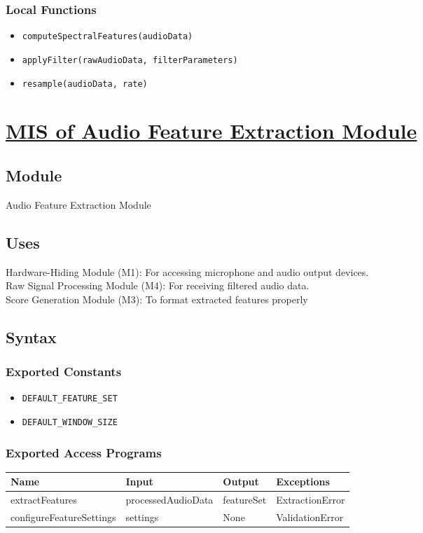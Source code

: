 \documentclass[12pt, titlepage]{article}
\begin{document}
\subsubsection{Local Functions}  
\begin{itemize}  
    \item \texttt{computeSpectralFeatures(audioData)}
    \item \texttt{applyFilter(rawAudioData, filterParameters)}  
    \item \texttt{resample(audioData, rate)}  
\end{itemize}  

\section{\hyperref[mAFE]{MIS of Audio Feature Extraction Module}} \label{M5}  

\subsection{Module}  
Audio Feature Extraction Module  

\subsection{Uses}
Hardware-Hiding Module (M1): For accessing microphone and audio output devices. \\
Raw Signal Processing Module (M4): For receiving filtered audio data. \\
Score Generation Module (M3): To format extracted features properly \\

\subsection{Syntax}  

\subsubsection{Exported Constants}  
\begin{itemize}
    \item \texttt{DEFAULT\_FEATURE\_SET}  
    \item \texttt{DEFAULT\_WINDOW\_SIZE}  
\end{itemize}  

\subsubsection{Exported Access Programs}  
\begin{center}  
\begin{tabular}{|p{4.5cm}|p{4cm}|p{2.5cm}|p{3.5cm}|}  
\hline  
\textbf{Name} & \textbf{Input} & \textbf{Output} & \textbf{Exceptions} \\  
\hline  
extractFeatures & processedAudioData & featureSet & ExtractionError \\  
configureFeatureSettings & settings & None & ValidationError \\  
\hline  
\end{tabular}  
\end{center}  
\end{document}
